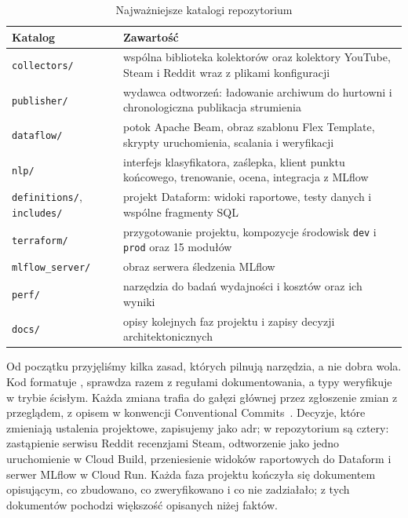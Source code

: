 \begin{table}[hbp]
  \caption{Najważniejsze katalogi repozytorium}
  \label{tab:repo-layout}
  \centering
  \small
  \begin{tabular}{|l|p{}|}
    \hline
    Katalog                        & Zawartość                                                                                         \\
    \hline
    \texttt{collectors/}           & wspólna biblioteka kolektorów oraz kolektory YouTube, Steam i Reddit wraz z plikami konfiguracji \\
    \hline
    \texttt{publisher/}            & wydawca odtworzeń: ładowanie archiwum do hurtowni i chronologiczna publikacja strumienia          \\
    \hline
    \texttt{dataflow/}             & potok Apache Beam, obraz szablonu Flex Template, skrypty uruchomienia, scalania i weryfikacji     \\
    \hline
    \texttt{nlp/}                  & interfejs klasyfikatora, zaślepka, klient punktu końcowego, trenowanie, ocena, integracja z MLflow \\
    \hline
    \texttt{definitions/}, \texttt{includes/} & projekt Dataform: widoki raportowe, testy danych i wspólne fragmenty SQL              \\
    \hline
    \texttt{terraform/}            & przygotowanie projektu, kompozycje środowisk \texttt{dev} i \texttt{prod} oraz 15 modułów        \\
    \hline
    \texttt{mlflow\_server/}       & obraz serwera śledzenia MLflow                                                                    \\
    \hline
    \texttt{perf/}                 & narzędzia do badań wydajności i kosztów oraz ich wyniki                                           \\
    \hline
    \texttt{docs/}                 & opisy kolejnych faz projektu i zapisy decyzji architektonicznych                                  \\
    \hline
  \end{tabular}
\end{table}

Od początku przyjęliśmy kilka zasad, których pilnują narzędzia, a nie dobra wola.
Kod formatuje , sprawdza  razem z regułami dokumentowania, a typy weryfikuje  w trybie ścisłym.
Każda zmiana trafia do gałęzi głównej przez zgłoszenie zmian z przeglądem, z opisem w konwencji Conventional Commits~\cite{conventionalcommits}.
Decyzje, które zmieniają ustalenia projektowe, zapisujemy jako \ac{adr}; w repozytorium są cztery: zastąpienie serwisu Reddit recenzjami Steam, odtworzenie jako jedno uruchomienie w Cloud Build, przeniesienie widoków raportowych do Dataform i serwer MLflow w Cloud Run.
Każda faza projektu kończyła się dokumentem opisującym, co zbudowano, co zweryfikowano i co nie zadziałało; z tych dokumentów pochodzi większość opisanych niżej faktów.

